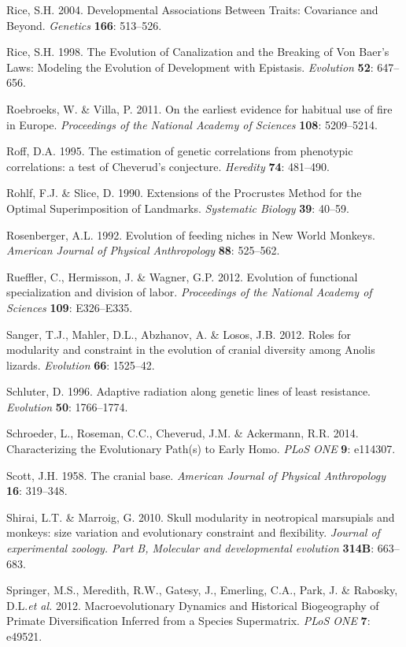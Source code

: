 \documentclass[12pt,twoside]{report}
\begin{document}
Rice, S.H. 2004. Developmental Associations Between Traits: Covariance
and Beyond. \emph{Genetics} \textbf{166}: 513--526.

Rice, S.H. 1998. The Evolution of Canalization and the Breaking of Von
Baer's Laws: Modeling the Evolution of Development with Epistasis.
\emph{Evolution} \textbf{52}: 647--656.

Roebroeks, W. \& Villa, P. 2011. On the earliest evidence for habitual
use of fire in Europe. \emph{Proceedings of the National Academy of
Sciences} \textbf{108}: 5209--5214.

Roff, D.A. 1995. The estimation of genetic correlations from phenotypic
correlations: a test of Cheverud's conjecture. \emph{Heredity}
\textbf{74}: 481--490.

Rohlf, F.J. \& Slice, D. 1990. Extensions of the Procrustes Method for
the Optimal Superimposition of Landmarks. \emph{Systematic Biology}
\textbf{39}: 40--59.

Rosenberger, A.L. 1992. Evolution of feeding niches in New World
Monkeys. \emph{American Journal of Physical Anthropology} \textbf{88}:
525--562.

Rueffler, C., Hermisson, J. \& Wagner, G.P. 2012. Evolution of
functional specialization and division of labor. \emph{Proceedings of
the National Academy of Sciences} \textbf{109}: E326--E335.

Sanger, T.J., Mahler, D.L., Abzhanov, A. \& Losos, J.B. 2012. Roles for
modularity and constraint in the evolution of cranial diversity among
Anolis lizards. \emph{Evolution} \textbf{66}: 1525--42.

Schluter, D. 1996. Adaptive radiation along genetic lines of least
resistance. \emph{Evolution} \textbf{50}: 1766--1774.

Schroeder, L., Roseman, C.C., Cheverud, J.M. \& Ackermann, R.R. 2014.
Characterizing the Evolutionary Path(s) to Early Homo. \emph{PLoS ONE}
\textbf{9}: e114307.

Scott, J.H. 1958. The cranial base. \emph{American Journal of Physical
Anthropology} \textbf{16}: 319--348.

Shirai, L.T. \& Marroig, G. 2010. Skull modularity in neotropical
marsupials and monkeys: size variation and evolutionary constraint and
flexibility. \emph{Journal of experimental zoology. Part B, Molecular
and developmental evolution} \textbf{314B}: 663--683.

Springer, M.S., Meredith, R.W., Gatesy, J., Emerling, C.A., Park, J. \&
Rabosky, D.L.\emph{et al.} 2012. Macroevolutionary Dynamics and
Historical Biogeography of Primate Diversification Inferred from a
Species Supermatrix. \emph{PLoS ONE} \textbf{7}: e49521.
\end{document}
